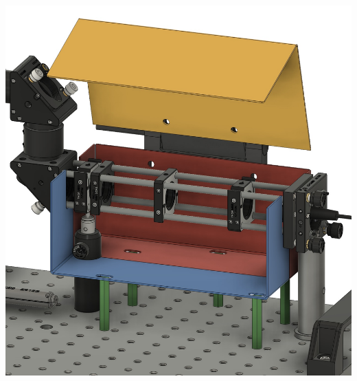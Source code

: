 \begin{minipage}{\textwidth}
\begin{minipage}[c]{0.48\textwidth}
\begin{center}
            \includegraphics[width=\textwidth]{assets/figures/Protections_laser/Securite_mecanique/Protection_entree_laser/model_3D_ouvert.jpeg}
        \end{center}
        \label{model_3D_ouvert}
    \end{minipage}



\end{minipage}
